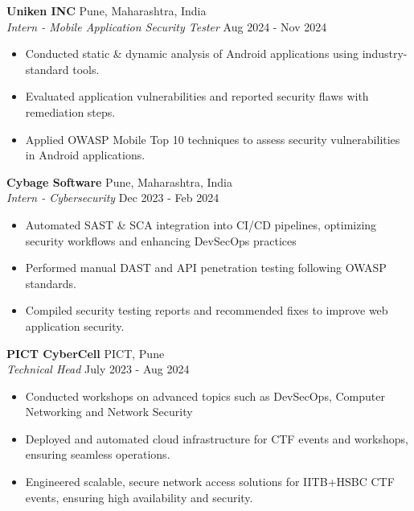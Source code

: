 \documentclass[a4paper]{article}
\begin{document}
\textbf{Uniken INC} \hfill Pune, Maharashtra, India\\
\textit{Intern - Mobile Application Security Tester} \hfill Aug 2024 - Nov 2024\\
\vspace{-1mm}
\begin{itemize} \itemsep 1pt
	\item Conducted static \& dynamic analysis of Android applications using industry-standard tools.
	\item Evaluated application vulnerabilities and reported security flaws with remediation steps.
	\item Applied OWASP Mobile Top 10 techniques to assess security vulnerabilities in Android applications.
\end{itemize}
\textbf{Cybage Software} \hfill Pune, Maharashtra, India\\
\textit{Intern - Cybersecurity} \hfill Dec 2023 - Feb 2024\\
\vspace{-1mm}
\begin{itemize} \itemsep 1pt
	\item Automated SAST \& SCA integration into CI/CD pipelines, optimizing security workflows and enhancing DevSecOps practices
	\item Performed manual DAST and API penetration testing following OWASP standards.
	\item Compiled security testing reports and recommended fixes to improve web application security.
\end{itemize}
\textbf{PICT CyberCell} \hfill PICT, Pune\\
\textit{Technical Head} \hfill July 2023 - Aug 2024\\
\vspace{-1mm}
\begin{itemize} \itemsep 1pt
	\item Conducted workshops on advanced topics such as DevSecOps, Computer Networking and Network Security
	\item Deployed and automated cloud infrastructure for CTF events and workshops, ensuring seamless operations.
	\item Engineered scalable, secure network access solutions for IITB+HSBC CTF events, ensuring high availability and security.
\end{itemize}
\end{document}
